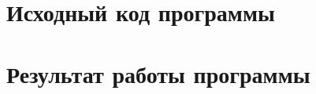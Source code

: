 \documentclass[14pt]{extreport}
\begin{document}
\begin{appendices}
\chapter{Исходный код программы}
{\footnotesize

\newpage

\newpage

\newpage

\newpage

\newpage

\newpage

\newpage

\newpage

}

\chapter{Результат работы программы}
{\footnotesize

}
\end{appendices}
\end{document}
